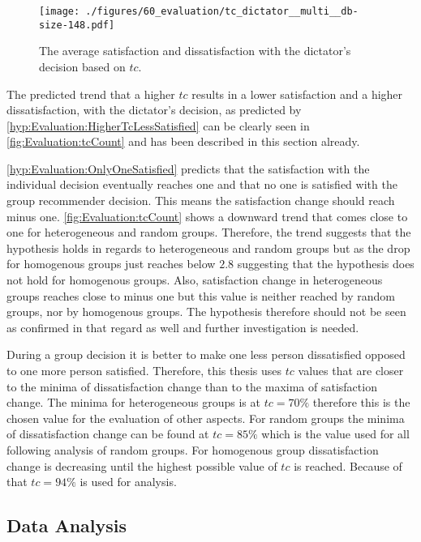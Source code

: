 \begin{figure}
    \centering
    \texttt{[image: ./figures/60\_evaluation/tc\_dictator\_\_multi\_\_db-size-148.pdf]}
    \caption{The average satisfaction and dissatisfaction with the dictator's decision based on $tc$.}
    \label{fig:Evaluation:tcCount}
\end{figure}

The predicted trend that a higher $tc$ results in a lower satisfaction and a higher dissatisfaction, with the dictator's decision, as predicted by \autoref{hyp:Evaluation:HigherTcLessSatisfied} can be clearly seen in \autoref{fig:Evaluation:tcCount} and has been described in this section already.

\autoref{hyp:Evaluation:OnlyOneSatisfied} predicts that the satisfaction with the individual decision eventually reaches one and that no one is satisfied with the group recommender decision. This means the satisfaction change should reach minus one. \autoref{fig:Evaluation:tcCount} shows a downward trend that comes close to one for heterogeneous and random groups. Therefore, the trend suggests that the hypothesis holds in regards to heterogeneous and random groups but as the drop for homogenous groups just reaches below $2.8$ suggesting that the hypothesis does not hold for homogenous groups. Also, satisfaction change in heterogeneous groups reaches close to minus one but this value is neither reached by random groups, nor by homogenous groups. The hypothesis therefore should not be seen as confirmed in that regard as well and further investigation is needed.

During a group decision it is better to make one less person dissatisfied opposed to one more person satisfied. Therefore, this thesis uses $tc$ values that are closer to the minima of dissatisfaction change than to the maxima of satisfaction change. The minima for heterogeneous groups is at $tc = 70\%$ therefore this is the chosen value for the evaluation of other aspects. For random groups the minima of dissatisfaction change can be found at $tc = 85\%$ which is the value used for all following analysis of random groups. For homogenous group dissatisfaction change is decreasing until the highest possible value of $tc$ is reached. Because of that $tc = 94\%$ is used for analysis.

\subsection{Data Analysis}

